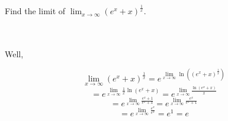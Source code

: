 Find the limit of $\lim_{x\rightarrow\infty}(e^x+x)^{\frac1x}$.\\\\

\begin{solution}\renewcommand{\qedsymbol}{}\ \\
    Well,
    
    $$\lim_{x\rightarrow\infty}(e^x+x)^{\frac1x}=e^{\lim_{x\rightarrow\infty}\ln((e^x+x)^{\frac1x})}$$
    $$=e^{\lim_{x\rightarrow\infty}\frac1x\ln(e^x+x)}=e^{\lim_{x\rightarrow\infty}\frac{\ln(e^x+x)}{x}}$$
    $$=e^{\lim_{x\rightarrow\infty}\frac{e^x+1}{e^x+x}}=e^{\lim_{x\rightarrow\infty}\frac{e^x}{e^x+1}}$$
    $$=e^{\lim_{x\rightarrow\infty}\frac{e^x}{e^x}}=e^1=e$$

\end{solution}
